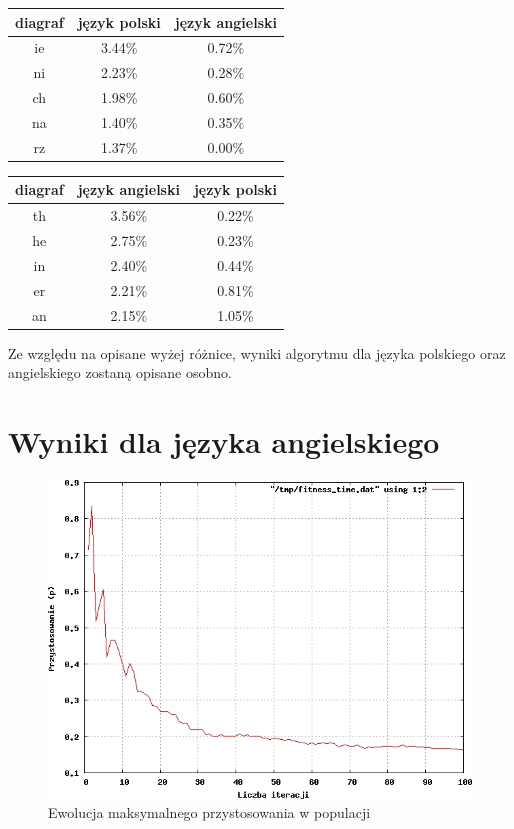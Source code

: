 \documentclass[brudnopis]{xmgr}
\begin{document}
\begin{tabular}{ c | c | c }
  diagraf & język polski & język angielski \\
  \hline
  ie &	3.44\% &	0.72\% \\
  ni &	2.23\% &	0.28\% \\
  ch &	1.98\% &	0.60\% \\
  na &	1.40\% &	0.35\% \\
  rz &	1.37\% &	0.00\% \\
\end{tabular}
\begin{tabular}{ c | c | c }
  diagraf & język angielski & język polski \\
  \hline
  th &	3.56\% &	0.22\% \\
  he &	2.75\% &	0.23\% \\
  in &	2.40\% &	0.44\% \\
  er &	2.21\% &	0.81\% \\
  an &	2.15\% &	1.05\% \\
\end{tabular}\newline

Ze względu na opisane wyżej różnice, wyniki algorytmu dla języka polskiego oraz angielskiego zostaną opisane osobno.


\section{Wyniki dla języka angielskiego}

\begin{figure}[!tbh]
\centering
\includegraphics[width=.8\hsize]{fig/fitness_time_en}
\caption{Ewolucja maksymalnego przystosowania w populacji}
\end{figure}
\end{document}

